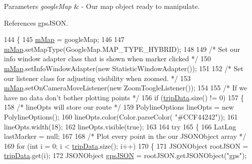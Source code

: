 \begin{DoxyParams}{Parameters}
{\em google\+Map} & -\/ Our map object ready to manipulate. \\
\hline
\end{DoxyParams}


References gps\+J\+S\+ON.


\begin{DoxyCode}
144                                                 \{
145         \hyperlink{class_android_app_1_1_maps_activity_a373d4c770d2ab34538f9288d7c0e83ea}{mMap} = googleMap;
146 
147         \hyperlink{class_android_app_1_1_maps_activity_a373d4c770d2ab34538f9288d7c0e83ea}{mMap}.setMapType(GoogleMap.MAP\_TYPE\_HYBRID);
148 
149         \textcolor{comment}{/* Set our info window adapter class that is shown when marker clicked */}
150         \hyperlink{class_android_app_1_1_maps_activity_a373d4c770d2ab34538f9288d7c0e83ea}{mMap}.setInfoWindowAdapter(\textcolor{keyword}{new} StatisticWindowAdapter());
151 
152         \textcolor{comment}{/* Set our listener class for adjusting visibility when zoomed. */}
153         \hyperlink{class_android_app_1_1_maps_activity_a373d4c770d2ab34538f9288d7c0e83ea}{mMap}.setOnCameraMoveListener(\textcolor{keyword}{new} ZoomToogleListener());
154 
155         \textcolor{comment}{/* If we have no data don't bother plotting points */}
156         \textcolor{keywordflow}{if} (\hyperlink{class_android_app_1_1_maps_activity_ad2fa23bd9f7f5a501e91329413608528}{tripData}.size() != 0)
157         \{
158             \textcolor{comment}{/* lineOpts will store our route */}
159             PolylineOptions lineOpts = \textcolor{keyword}{new} PolylineOptions();
160             lineOpts.color(Color.parseColor( \textcolor{stringliteral}{"#CCF44242"}));
161             lineOpts.width(18);
162             lineOpts.visible(\textcolor{keyword}{true});
163 
164             \textcolor{keywordflow}{try}
165             \{
166                 LatLng lastMarker = null;
167 
168                 \textcolor{comment}{/* Plot every point in the our JSONObject array */}
169                 \textcolor{keywordflow}{for} (\textcolor{keywordtype}{int} i = 0; i < \hyperlink{class_android_app_1_1_maps_activity_ad2fa23bd9f7f5a501e91329413608528}{tripData}.size(); i++)
170                 \{
171                     JSONObject rootJSON = \hyperlink{class_android_app_1_1_maps_activity_ad2fa23bd9f7f5a501e91329413608528}{tripData}.get(i);
172                     JSONObject \hyperlink{logging-device_8ino_a548727e041a5cd3db91bdbd0ccd71e30}{gpsJSON} = rootJSON.getJSONObject(\textcolor{stringliteral}{"gps"});

\end{DoxyCode}
